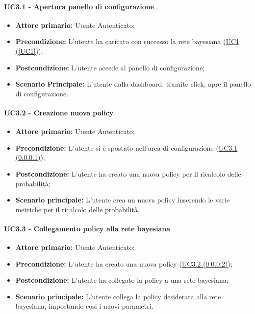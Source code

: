 \paragraph{UC3.1 - Apertura panello di configurazione}\label{UC3.1}
\begin{itemize}
	\item \textbf{Attore primario:} Utente Autenticato; 
	\item \textbf{Precondizione:} L'utente ha caricato con successo la rete bayesiana (\hyperref[UC1]{UC1 (\ref*{UC1})});
	\item \textbf{Postcondizione:} L'utente accede al panello di configurazione;
	\item \textbf{Scenario Principale:} L'utente dalla dashboard, tramite click, apre il panello di configurazione. 
\end{itemize}

\paragraph{UC3.2 - Creazione nuova policy}\label{UC3.2}

\begin{itemize}
	\item \textbf{Attore primario:} Utente Autenticato; 
	\item \textbf{Precondizione:} L'utente si è spostato nell'area di configurazione (\hyperref[UC3.1]{UC3.1 (\ref*{UC3.1})});
	\item \textbf{Postcondizione:} L'utente ha creato una nuova policy per il ricalcolo delle probabilità; 
	\item \textbf{Scenario principale:} L'utente crea un nuova policy inserendo le varie metriche per il ricalcolo delle probabilità.
\end{itemize}

\paragraph{UC3.3 - Collegamento policy alla rete bayesiana}
\begin{itemize}
	\item \textbf{Attore primario:} Utente Autenticato; 
	\item \textbf{Precondizione:} L'utente ha creato una nuova policy (\hyperref[UC3.2]{UC3.2 (\ref{UC3.2})});
	\item \textbf{Postcondizione:} L'utente ha collegato la policy a una rete bayesiana; 
	\item \textbf{Scenario principale:} L'utente collega la policy desiderata alla rete bayesiana, impostando cosi i nuovi parametri. 
\end{itemize}
\newpage
